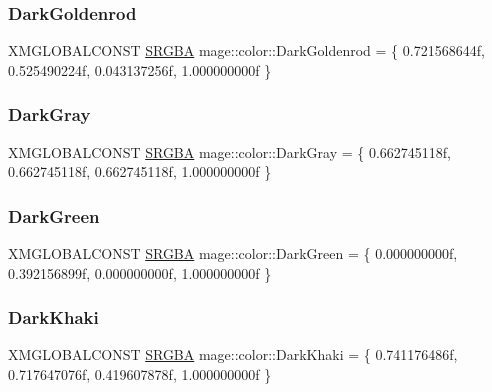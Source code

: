 \hypertarget{namespacemage_1_1color_a2823510fdf69efc81864c1b42c875c93}{}\label{namespacemage_1_1color_a2823510fdf69efc81864c1b42c875c93} 
\subsubsection{\texorpdfstring{Dark\+Goldenrod}{DarkGoldenrod}}
{\footnotesize\ttfamily X\+M\+G\+L\+O\+B\+A\+L\+C\+O\+N\+ST \hyperlink{structmage_1_1_s_r_g_b_a}{S\+R\+G\+BA} mage\+::color\+::\+Dark\+Goldenrod = \{ 0.\+721568644f, 0.\+525490224f, 0.\+043137256f, 1.\+000000000f \}}

\hypertarget{namespacemage_1_1color_a49c50e740fe28a79fd2235907247d452}{}\label{namespacemage_1_1color_a49c50e740fe28a79fd2235907247d452} 
\subsubsection{\texorpdfstring{Dark\+Gray}{DarkGray}}
{\footnotesize\ttfamily X\+M\+G\+L\+O\+B\+A\+L\+C\+O\+N\+ST \hyperlink{structmage_1_1_s_r_g_b_a}{S\+R\+G\+BA} mage\+::color\+::\+Dark\+Gray = \{ 0.\+662745118f, 0.\+662745118f, 0.\+662745118f, 1.\+000000000f \}}

\hypertarget{namespacemage_1_1color_a07927c32593810cc4c48334cbd3fde8a}{}\label{namespacemage_1_1color_a07927c32593810cc4c48334cbd3fde8a} 
\subsubsection{\texorpdfstring{Dark\+Green}{DarkGreen}}
{\footnotesize\ttfamily X\+M\+G\+L\+O\+B\+A\+L\+C\+O\+N\+ST \hyperlink{structmage_1_1_s_r_g_b_a}{S\+R\+G\+BA} mage\+::color\+::\+Dark\+Green = \{ 0.\+000000000f, 0.\+392156899f, 0.\+000000000f, 1.\+000000000f \}}

\hypertarget{namespacemage_1_1color_af67bbefc1beb8e24c062e492d78b2cc0}{}\label{namespacemage_1_1color_af67bbefc1beb8e24c062e492d78b2cc0} 
\subsubsection{\texorpdfstring{Dark\+Khaki}{DarkKhaki}}
{\footnotesize\ttfamily X\+M\+G\+L\+O\+B\+A\+L\+C\+O\+N\+ST \hyperlink{structmage_1_1_s_r_g_b_a}{S\+R\+G\+BA} mage\+::color\+::\+Dark\+Khaki = \{ 0.\+741176486f, 0.\+717647076f, 0.\+419607878f, 1.\+000000000f \}}

